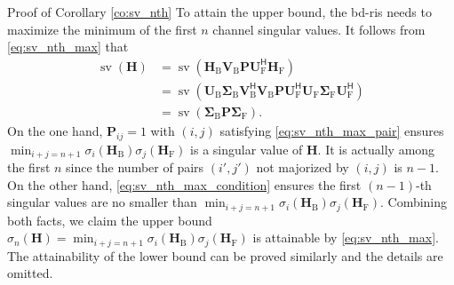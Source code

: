 \documentclass[journal]{IEEEtran}
\DeclareMathOperator{\sv}{sv}
\begin{document}
\begin{appendix}
\begin{subsection}{Proof of Corollary \ref{co:sv_nth}}
		To attain the upper bound, the \gls{bd}-\gls{ris} needs to maximize the minimum of the first $n$ channel singular values.
		It follows from \eqref{eq:sv_nth_max} that
		\begin{equation*}
			\begin{split}
				\sv(\mathbf{H})
				& = \sv(\mathbf{H}_\mathrm{B} \mathbf{V}_\mathrm{B} \mathbf{P} \mathbf{U}_\mathrm{F}^\mathsf{H} \mathbf{H}_\mathrm{F}) \\
				& = \sv(\mathbf{U}_\mathrm{B} \mathbf{\Sigma}_\mathrm{B} \mathbf{V}_\mathrm{B}^\mathsf{H} \mathbf{V}_\mathrm{B} \mathbf{P} \mathbf{U}_\mathrm{F}^\mathsf{H} \mathbf{U}_\mathrm{F} \mathbf{\Sigma}_\mathrm{F} \mathbf{U}_\mathrm{F}^\mathsf{H}) \\
				& = \sv(\mathbf{\Sigma}_\mathrm{B} \mathbf{P} \mathbf{\Sigma}_\mathrm{F}).
			\end{split}
		\end{equation*}
		On the one hand, $\mathbf{P}_{ij}=1$ with $(i, j)$ satisfying \eqref{eq:sv_nth_max_pair} ensures $\min_{i+j=n+1} \sigma_i(\mathbf{H}_\mathrm{B}) \sigma_j(\mathbf{H}_\mathrm{F})$ is a singular value of $\mathbf{H}$.
		It is actually among the first $n$ since the number of pairs $(i',j')$ not majorized by $(i,j)$ is $n-1$.
		On the other hand, \eqref{eq:sv_nth_max_condition} ensures the first $(n-1)$-th singular values are no smaller than $\min_{i+j=n+1} \sigma_i(\mathbf{H}_\mathrm{B}) \sigma_j(\mathbf{H}_\mathrm{F})$.
		Combining both facts, we claim the upper bound $\sigma_n(\mathbf{H}) = \min_{i+j=n+1} \sigma_i(\mathbf{H}_\mathrm{B}) \sigma_j(\mathbf{H}_\mathrm{F})$ is attainable by \eqref{eq:sv_nth_max}.
		The attainability of the lower bound can be proved similarly and the details are omitted.



\end{subsection}
\end{appendix}
\end{document}
